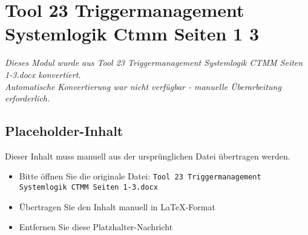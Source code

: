 
\section{Tool 23 Triggermanagement Systemlogik Ctmm Seiten 1 3}
\label{sec:tool-23-triggermanagement-systemlogik-ctmm-seiten-1-3}

\begin{center}
\textit{Dieses Modul wurde aus Tool 23 Triggermanagement Systemlogik CTMM Seiten 1-3.docx konvertiert.\\
Automatische Konvertierung war nicht verfügbar - manuelle Überarbeitung erforderlich.}
\end{center}


\subsection{Placeholder-Inhalt}

Dieser Inhalt muss manuell aus der ursprünglichen Datei übertragen werden.

\begin{itemize}
\item Bitte öffnen Sie die originale Datei: \texttt{Tool 23 Triggermanagement Systemlogik CTMM Seiten 1-3.docx}
\item Übertragen Sie den Inhalt manuell in LaTeX-Format
\item Entfernen Sie diese Platzhalter-Nachricht
\end{itemize}
